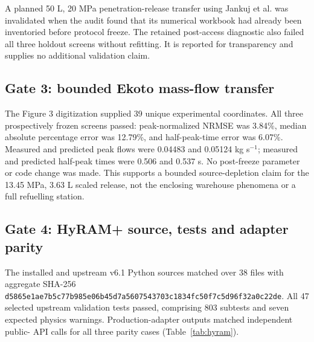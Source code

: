 \documentclass[12pt,a4paper]{article}
\begin{document}
A planned 50 L, 20 MPa penetration-release transfer using Jankuj et al.
\cite{jankuj2026} was invalidated when the audit found that its numerical
workbook had already been inventoried before protocol freeze. The retained
post-access diagnostic also failed all three holdout screens without refitting.
It is reported for transparency and supplies no additional validation claim.

\subsection{Gate 3: bounded Ekoto mass-flow transfer}
The Figure 3 digitization supplied 39 unique experimental coordinates. All
three prospectively frozen screens passed: peak-normalized NRMSE was 3.84\%,
median absolute percentage error was 12.79\%, and half-peak-time error was
6.07\%. Measured and predicted peak flows were 0.04483 and 0.05124 kg s$^{-1}$;
measured and predicted half-peak times were 0.506 and 0.537 s. No post-freeze
parameter or code change was made. This supports a bounded source-depletion claim
for the 13.45 MPa, 3.63 L scaled release, not the enclosing warehouse phenomena
or a full refuelling station.

\subsection{Gate 4: HyRAM+ source, tests and adapter parity}
The installed and upstream v6.1 Python sources matched over 38 files with aggregate
SHA-256 \texttt{d5865e1ae7b5c77b985e06b45d7a5607543703c1834fc50f7c5d96f32a0c22de}.
All 47 selected upstream validation tests passed, comprising 803 subtests and seven
expected physics warnings. Production-adapter outputs matched independent public-
API calls for all three parity cases (Table~\ref{tab:hyram}).

\begin{table}[htbp]
\centering
\caption{Station-scale HyRAM+ 6.1 adapter parity. The plume distance is directional.}
\label{tab:hyram}
\small
{}
\end{table}
\end{document}
